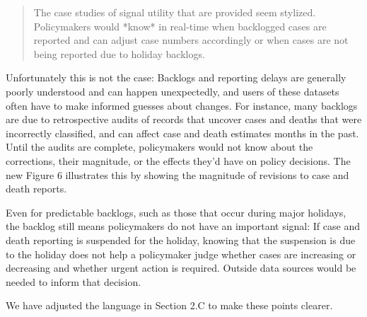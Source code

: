 \documentclass[11pt]{article}
\begin{document}
\begin{quote}
  The case studies of signal utility that are provided seem stylized.
  Policymakers would *know* in real-time when backlogged cases are reported and
  can adjust case numbers accordingly or when cases are not being reported due
  to holiday backlogs.
\end{quote}
Unfortunately this is not the case: Backlogs and reporting delays are generally
poorly understood and can happen unexpectedly, and users of these datasets often
have to make informed guesses about changes. For instance, many backlogs are due
to retrospective audits of records that uncover cases and deaths that were
incorrectly classified, and can affect case and death estimates months in the
past. Until the audits are complete, policymakers would not know about the
corrections, their magnitude, or the effects they'd have on policy decisions.
The new Figure 6 illustrates this by showing the magnitude of revisions to case
and death reports.

Even for predictable backlogs, such as those that occur during major holidays,
the backlog still means policymakers do not have an important signal: If case
and death reporting is suspended for the holiday, knowing that the suspension is
due to the holiday does not help a policymaker judge whether cases are
increasing or decreasing and whether urgent action is required. Outside data
sources would be needed to inform that decision.

We have adjusted the language in Section 2.C to make these points clearer.
\end{document}
